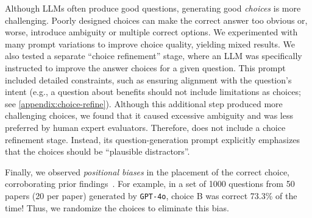 Although LLMs often produce good questions, generating good {\em choices} is more challenging. Poorly designed choices can make the correct answer too obvious or, worse, introduce ambiguity or multiple correct options. We experimented with many prompt variations to improve choice quality, yielding mixed results. We also tested a separate ``choice refinement'' stage, where an LLM was specifically instructed to improve the answer choices for a given question. This prompt included detailed constraints, such as ensuring alignment with the question's intent (e.g., a question about benefits should not include limitations as choices; see \autoref{appendix:choice-refine}).
Although this additional step produced more challenging choices, we found that it caused excessive ambiguity and was less preferred by human expert evaluators. Therefore, \name does not include a choice refinement stage. Instead, its question-generation prompt explicitly emphasizes that the choices should be ``plausible distractors''.

Finally, we observed {\em positional biases} in the placement of the correct choice, corroborating prior findings~\cite{pezeshkpour2023large}. For example, in a set of 1000 questions from 50 papers (20 per paper) generated by \texttt{GPT-4o}, choice B was correct 73.3\% of the time! Thus, we randomize the choices to eliminate this bias.

